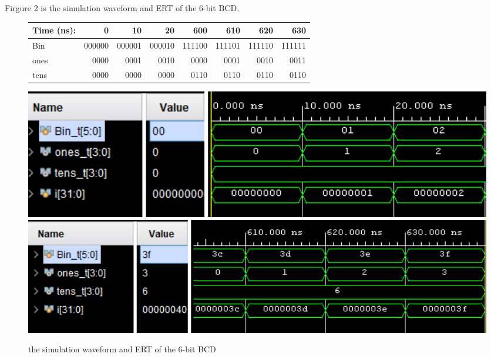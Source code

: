 \documentclass[11pt]{article}
\begin{document}
Firgure 2 is the simulation waveform and ERT of the 6-bit BCD.\\
\begin{figure}[ht]\centering
	\begin{tabular}{l|rrr|rrrr}
		Time (ns): & 0 & 10 & 20 & 600 & 610 & 620 & 630 \\
		\midrule
		Bin & 000000 & 000001 & 000010 & 111100 & 111101 & 111110 & 111111 \\
		\midrule
		ones & 0000 & 0001 & 0010 & 0000 & 0001 & 0010 & 0011 \\
		tens & 0000 & 0000 & 0000 & 0110 & 0110 & 0110 & 0110 \\
		\bottomrule
	\end{tabular}\medskip
	
	\includegraphics[width=1\textwidth]{bcd6_simulate_beginning}
	\includegraphics[width=1\textwidth]{bcd6_simulate_end}
	\caption{the simulation waveform and ERT of the 6-bit BCD}
	\label{fig:bcd6_simulate}
\end{figure}
\end{document}
